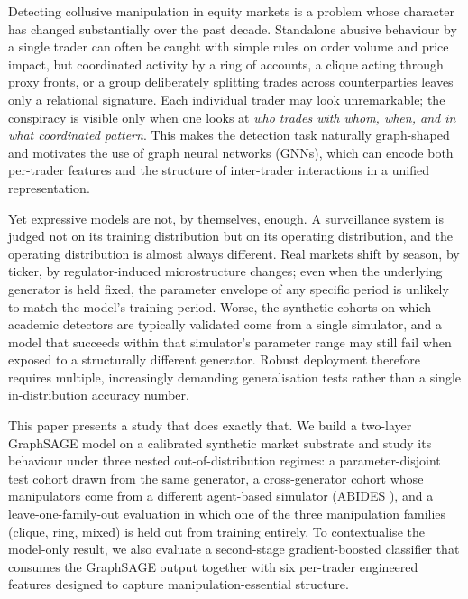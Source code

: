 \documentclass[10pt,twocolumn,letterpaper]{article}
\begin{document}
Detecting collusive manipulation in equity markets is a problem whose
character has changed substantially over the past decade. Standalone
abusive behaviour by a single trader can often be caught with simple
rules on order volume and price impact, but coordinated activity by a
ring of accounts, a clique acting through proxy fronts, or a group
deliberately splitting trades across counterparties leaves only a
relational signature. Each individual trader may look unremarkable;
the conspiracy is visible only when one looks at \emph{who trades with
whom, when, and in what coordinated pattern}. This makes the detection
task naturally graph-shaped and motivates the use of graph neural
networks (GNNs), which can encode both per-trader features and the
structure of inter-trader interactions in a unified representation.

Yet expressive models are not, by themselves, enough. A surveillance
system is judged not on its training distribution but on its operating
distribution, and the operating distribution is almost always different.
Real markets shift by season, by ticker, by regulator-induced
microstructure changes; even when the underlying generator is held
fixed, the parameter envelope of any specific period is unlikely to
match the model's training period. Worse, the synthetic cohorts on which
academic detectors are typically validated come from a single simulator,
and a model that succeeds within that simulator's parameter range may
still fail when exposed to a structurally different generator. Robust
deployment therefore requires multiple, increasingly demanding
generalisation tests rather than a single in-distribution accuracy
number.

This paper presents a study that does exactly that. We build a two-layer
GraphSAGE model on a calibrated synthetic market substrate and study its
behaviour under three nested out-of-distribution regimes: a
parameter-disjoint test cohort drawn from the same generator, a
cross-generator cohort whose manipulators come from a different
agent-based simulator (ABIDES \cite{byrd2019abides}), and a
leave-one-family-out evaluation in which one of the three manipulation
families (clique, ring, mixed) is held out from training entirely. To
contextualise the model-only result, we also evaluate a second-stage
gradient-boosted classifier that consumes the GraphSAGE output together
with six per-trader engineered features designed to capture
manipulation-essential structure.
\end{document}
